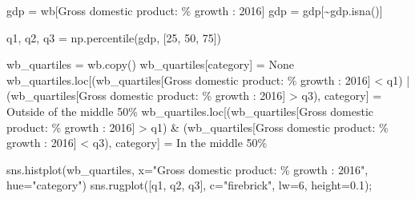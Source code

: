 \documentclass[
  letterpaper,
  DIV=11,
  numbers=noendperiod]{scrreprt}
\newenvironment{Shaded}{\begin{snugshade}}{\end{snugshade}}
\newcommand{\DecValTok}[1]{\textcolor[rgb]{0.68,0.00,0.00}{#1}}
\newcommand{\FloatTok}[1]{\textcolor[rgb]{0.68,0.00,0.00}{#1}}
\newcommand{\NormalTok}[1]{\textcolor[rgb]{0.00,0.23,0.31}{#1}}
\newcommand{\OperatorTok}[1]{\textcolor[rgb]{0.37,0.37,0.37}{#1}}
\newcommand{\SpecialCharTok}[1]{\textcolor[rgb]{0.37,0.37,0.37}{#1}}
\newcommand{\StringTok}[1]{\textcolor[rgb]{0.13,0.47,0.30}{#1}}
\newcommand{\VariableTok}[1]{\textcolor[rgb]{0.07,0.07,0.07}{#1}}
\begin{document}
\begin{Shaded}
\begin{Highlighting}[]
\NormalTok{gdp }\OperatorTok{=}\NormalTok{ wb[}\StringTok{\textquotesingle{}Gross domestic product: }\SpecialCharTok{\% g}\StringTok{rowth : 2016\textquotesingle{}}\NormalTok{]}
\NormalTok{gdp }\OperatorTok{=}\NormalTok{ gdp[}\OperatorTok{\textasciitilde{}}\NormalTok{gdp.isna()]}

\NormalTok{q1, q2, q3 }\OperatorTok{=}\NormalTok{ np.percentile(gdp, [}\DecValTok{25}\NormalTok{, }\DecValTok{50}\NormalTok{, }\DecValTok{75}\NormalTok{])}

\NormalTok{wb\_quartiles }\OperatorTok{=}\NormalTok{ wb.copy()}
\NormalTok{wb\_quartiles[}\StringTok{\textquotesingle{}category\textquotesingle{}}\NormalTok{] }\OperatorTok{=} \VariableTok{None}
\NormalTok{wb\_quartiles.loc[(wb\_quartiles[}\StringTok{\textquotesingle{}Gross domestic product: }\SpecialCharTok{\% g}\StringTok{rowth : 2016\textquotesingle{}}\NormalTok{] }\OperatorTok{\textless{}}\NormalTok{ q1) }\OperatorTok{|}\NormalTok{ (wb\_quartiles[}\StringTok{\textquotesingle{}Gross domestic product: }\SpecialCharTok{\% g}\StringTok{rowth : 2016\textquotesingle{}}\NormalTok{] }\OperatorTok{\textgreater{}}\NormalTok{ q3), }\StringTok{\textquotesingle{}category\textquotesingle{}}\NormalTok{] }\OperatorTok{=} \StringTok{\textquotesingle{}Outside of the middle 50\%\textquotesingle{}}
\NormalTok{wb\_quartiles.loc[(wb\_quartiles[}\StringTok{\textquotesingle{}Gross domestic product: }\SpecialCharTok{\% g}\StringTok{rowth : 2016\textquotesingle{}}\NormalTok{] }\OperatorTok{\textgreater{}}\NormalTok{ q1) }\OperatorTok{\&}\NormalTok{ (wb\_quartiles[}\StringTok{\textquotesingle{}Gross domestic product: }\SpecialCharTok{\% g}\StringTok{rowth : 2016\textquotesingle{}}\NormalTok{] }\OperatorTok{\textless{}}\NormalTok{ q3), }\StringTok{\textquotesingle{}category\textquotesingle{}}\NormalTok{] }\OperatorTok{=} \StringTok{\textquotesingle{}In the middle 50\%\textquotesingle{}}

\NormalTok{sns.histplot(wb\_quartiles, x}\OperatorTok{=}\StringTok{"Gross domestic product: }\SpecialCharTok{\% g}\StringTok{rowth : 2016"}\NormalTok{, hue}\OperatorTok{=}\StringTok{"category"}\NormalTok{)}
\NormalTok{sns.rugplot([q1, q2, q3], c}\OperatorTok{=}\StringTok{"firebrick"}\NormalTok{, lw}\OperatorTok{=}\DecValTok{6}\NormalTok{, height}\OperatorTok{=}\FloatTok{0.1}\NormalTok{)}\OperatorTok{;}
\end{Highlighting}
\end{Shaded}
\end{document}
